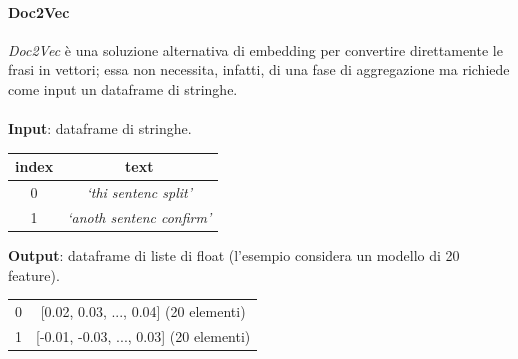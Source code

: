 \documentclass[12pt]{report}
\theoremstyle{definition}
\begin{document}
\paragraph{Doc2Vec}
\textit{Doc2Vec} è una soluzione alternativa di embedding per convertire direttamente le frasi in vettori; essa non necessita, infatti, di una fase di aggregazione ma richiede come input un dataframe di stringhe.
\\
\\
\textbf{Input}: dataframe di stringhe.
\begin{center}
    \begin{tabular}{|c|c|}
    \hline
    \textbf{index} & \textbf{text} \\
    \hline
         0 & \textit{`thi sentenc split'}\\
         1 & \textit{`anoth sentenc confirm'}\\
    \hline
    \end{tabular}
\end{center}
\textbf{Output}: dataframe di liste di float (l'esempio considera un modello di 20 feature).
\begin{center}
    \begin{tabular}{|c|c|}
    \hline
         0 & [0.02, 0.03, ..., 0.04] (20 elementi) \\
         1 & [-0.01, -0.03, ..., 0.03] (20 elementi) \\
    \hline
    \end{tabular}
\end{center}
\end{document}

